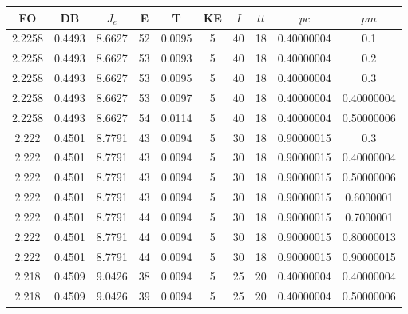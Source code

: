 \begin{table}[h!]
    \footnotesize
    \begin{center}
        \begin{tabular}{|c|c|c|c|c|c|c|c|c|c|}
        \hline
            {\bf FO} & {\bf DB} & $J_e$ & {\bf E} & {\bf T} & {\bf KE} & $I$ & $tt$ & $pc$ & $pm$ \\
        \hline
        \hline
            2.2258 & 0.4493  & 8.6627 & 52 & 0.0095 & 5 & 40 & 18 & 0.40000004 & 0.1\\
        \hline
        \hline
            2.2258 & 0.4493  & 8.6627 & 53 & 0.0093 & 5 & 40 & 18 & 0.40000004 & 0.2\\
        \hline
        \hline
            2.2258 & 0.4493  & 8.6627 & 53 & 0.0095 & 5 & 40 & 18 & 0.40000004 & 0.3\\
        \hline
        \hline
            2.2258 & 0.4493  & 8.6627 & 53 & 0.0097 & 5 & 40 & 18 & 0.40000004 & 0.40000004\\
        \hline
        \hline
            2.2258 & 0.4493  & 8.6627 & 54 & 0.0114 & 5 & 40 & 18 & 0.40000004 & 0.50000006\\
        \hline
        \hline
            2.222 & 0.4501  & 8.7791 & 43 & 0.0094 & 5 & 30 & 18 & 0.90000015 & 0.3\\
        \hline
        \hline
            2.222 & 0.4501  & 8.7791 & 43 & 0.0094 & 5 & 30 & 18 & 0.90000015 & 0.40000004\\
        \hline
        \hline
            2.222 & 0.4501  & 8.7791 & 43 & 0.0094 & 5 & 30 & 18 & 0.90000015 & 0.50000006\\
        \hline
        \hline
            2.222 & 0.4501  & 8.7791 & 43 & 0.0094 & 5 & 30 & 18 & 0.90000015 & 0.6000001\\
        \hline
        \hline
            2.222 & 0.4501  & 8.7791 & 44 & 0.0094 & 5 & 30 & 18 & 0.90000015 & 0.7000001\\
        \hline
        \hline
            2.222 & 0.4501  & 8.7791 & 44 & 0.0094 & 5 & 30 & 18 & 0.90000015 & 0.80000013\\
        \hline
        \hline
            2.222 & 0.4501  & 8.7791 & 44 & 0.0094 & 5 & 30 & 18 & 0.90000015 & 0.90000015\\
        \hline
        \hline
            2.218 & 0.4509  & 9.0426 & 38 & 0.0094 & 5 & 25 & 20 & 0.40000004 & 0.40000004\\
        \hline
        \hline
            2.218 & 0.4509  & 9.0426 & 39 & 0.0094 & 5 & 25 & 20 & 0.40000004 & 0.50000006\\

\end{tabular}
\end{center}
\end{table}
